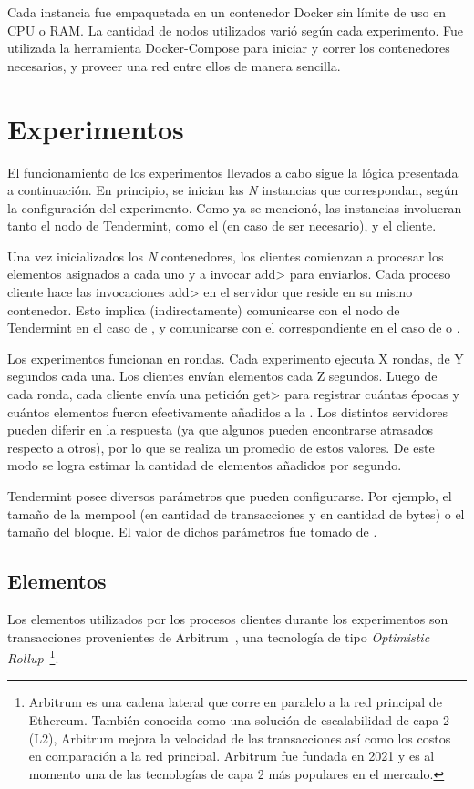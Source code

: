 %
Cada instancia fue empaquetada en un contenedor Docker sin límite de uso en CPU
o RAM.
%
La cantidad de nodos utilizados varió según cada experimento.
%
Fue utilizada la herramienta Docker-Compose para iniciar y correr los contenedores necesarios,
y proveer una red entre ellos de manera sencilla.


\section{Experimentos}
El funcionamiento de los experimentos llevados a cabo sigue la lógica presentada a continuación.
%
En principio, se inician las \textit{N} instancias que correspondan, según la configuración del experimento.
%
Como ya se mencionó, las instancias involucran tanto el nodo de Tendermint, como el \collector (en caso de
ser necesario), y el cliente.
%

Una vez inicializados los \textit{N} contenedores, los clientes comienzan a procesar los elementos asignados a cada
uno y a invocar \<add> para enviarlos.
%
Cada proceso cliente hace las invocaciones \<add> en el servidor que reside en su mismo contenedor. 
%
Esto implica (indirectamente) comunicarse con el nodo de Tendermint en el caso de \vanilla, y
comunicarse con el \collector correspondiente en el caso de \compresschain o \hashchain.

Los experimentos funcionan en rondas.
%
Cada experimento ejecuta X rondas, de Y segundos cada una.
%
Los clientes envían elementos cada Z segundos.
%
Luego de cada ronda, cada cliente envía una petición \<get> para registrar cuántas épocas y cuántos
elementos fueron efectivamente añadidos a la \setchain.
%
Los distintos servidores pueden diferir en la respuesta (ya que algunos pueden encontrarse atrasados
respecto a otros), por lo que se realiza un promedio de estos valores.
%
De este modo se logra estimar la cantidad de elementos añadidos por segundo.

Tendermint posee diversos parámetros que pueden configurarse.
Por ejemplo, el tamaño de la mempool
(en cantidad de transacciones y en cantidad de bytes) o el tamaño del bloque.
El valor de dichos parámetros fue tomado de \cite{tendermint.design}.


\subsection{Elementos}
Los elementos utilizados por los procesos clientes durante los experimentos son transacciones provenientes
de Arbitrum~\cite{Kalodner2018Arbitrum}, una tecnología de tipo \textit{Optimistic Rollup}~\footnote{
Arbitrum es una cadena lateral que corre en paralelo a la red principal de Ethereum.
También conocida como una solución de escalabilidad de capa 2 (L2), Arbitrum mejora la velocidad de las transacciones así
como los costos en comparación a la red principal.
Arbitrum fue fundada en 2021 y es al momento una de las tecnologías de capa 2 más populares en el mercado.}.
%

